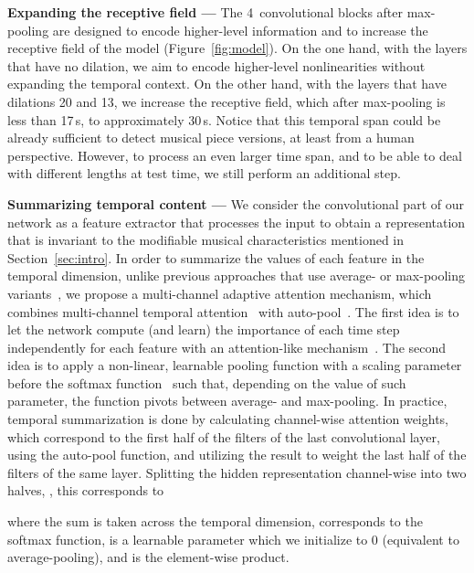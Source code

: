 \documentclass[letterpaper]{article}
\begin{document}
\noindent
\textbf{Expanding the receptive field ---} The 4~convolutional blocks after max-pooling are designed to encode higher-level information and to increase the receptive field of the model (Figure~\ref{fig:model}). On the one hand, with the layers that have no dilation, we aim to encode higher-level nonlinearities without expanding the temporal context. On the other hand, with the layers that have dilations 20 and 13, we increase the receptive field, which after max-pooling is less than 17\,s, to approximately 30\,s. Notice that this temporal span could be already sufficient to detect musical piece versions, at least from a human perspective. However, to process an even larger time span, and to be able to deal with different lengths  at test time, we still perform an additional step.

\noindent
\textbf{Summarizing temporal content ---} We consider the convolutional part of our network as a feature extractor that processes the input to obtain a representation that is invariant to the modifiable musical characteristics mentioned in Section~\ref{sec:intro}. In order to summarize the values of each feature in the temporal dimension, unlike previous approaches that use average- or max-pooling variants~\cite{doras2019, yu2019}, we propose a multi-channel adaptive attention mechanism, which combines multi-channel temporal attention~\cite{Serra18AIRD} with auto-pool~\cite{mcfee2018}. The first idea is to let the network compute (and learn) the importance of each time step independently for each feature with an attention-like mechanism~\cite{Serra18AIRD}. The second idea is to apply a non-linear, learnable pooling function with a scaling parameter before the softmax function~\cite{mcfee2018} such that, depending on the value of such parameter, the function pivots between average- and max-pooling. In practice, temporal summarization is done by calculating channel-wise attention weights, which correspond to the first half of the filters of the last convolutional layer, using the auto-pool function, and utilizing the result to weight the last half of the filters of the same layer. Splitting the hidden representation channel-wise into two halves, , this corresponds to

where the sum is taken across the temporal dimension,  corresponds to the softmax function,  is a learnable parameter which we initialize to 0 (equivalent to average-pooling), and  is the element-wise product.
\end{document}
